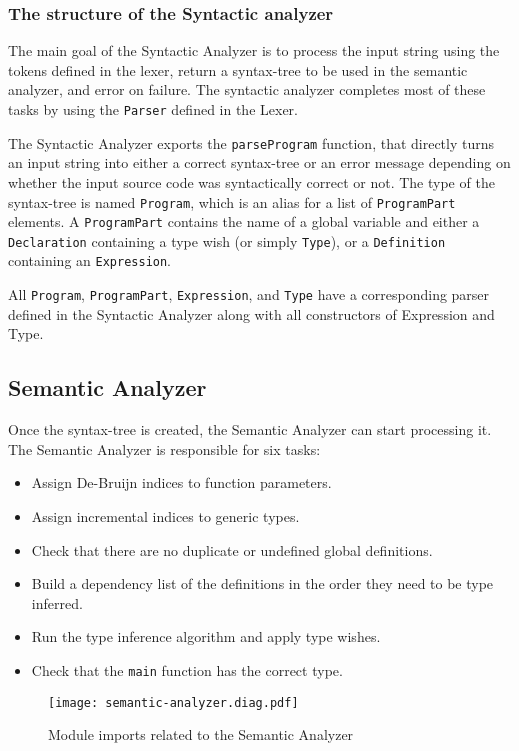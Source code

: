 \documentclass[12pt]{article}
\begin{document}
\subsubsection{The structure of the Syntactic analyzer}

The main goal of the Syntactic Analyzer is to process the input string using the
tokens defined in the lexer, return a syntax-tree to be used in the semantic
analyzer, and error on failure. The syntactic analyzer completes most of these
tasks by using the \verb$Parser$ defined in the Lexer.

The Syntactic Analyzer exports the \verb$parseProgram$ function, that directly
turns an input string into either a correct syntax-tree or an error message
depending on whether the input source code was syntactically correct or not. The
type of the syntax-tree is named \verb$Program$, which is an alias for a list of
\verb$ProgramPart$ elements. A \verb$ProgramPart$ contains the name of a global
variable and either a \verb$Declaration$ containing a type wish (or simply
\verb$Type$), or a \verb$Definition$ containing an \verb$Expression$.

All \verb$Program$, \verb$ProgramPart$, \verb$Expression$, and \verb$Type$ have
a corresponding parser defined in the Syntactic Analyzer along with all
constructors of Expression and Type.

\subsection{Semantic Analyzer}

Once the syntax-tree is created, the Semantic Analyzer can start processing it.
The Semantic Analyzer is responsible for six tasks:
\begin{itemize}
    \item Assign De-Bruijn indices to function parameters.
    \item Assign incremental indices to generic types.
    \item Check that there are no duplicate or undefined global definitions.
    \item Build a dependency list of the definitions in the order they need to
        be type inferred.
    \item Run the type inference algorithm and apply type wishes.
    \item Check that the \verb$main$ function has the correct type.
\end{itemize}

\begin{figure}[t]
\texttt{[image: semantic-analyzer.diag.pdf]}
\centering
\caption{Module imports related to the Semantic Analyzer}
\end{figure}
\end{document}
